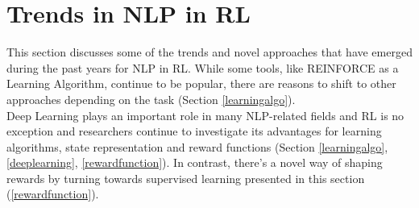 \documentclass[11pt]{article}
\begin{document}
\section{Trends in NLP in RL}\label{trends}
This section discusses some of the trends and novel approaches that have emerged during the past years for NLP in RL. While some tools, like REINFORCE as a Learning Algorithm, continue to be popular, there are reasons to shift to other approaches depending on the task (Section \ref{learningalgo}). \\ Deep Learning plays an important role in many NLP-related fields and RL is no exception and researchers continue to investigate its advantages for learning algorithms, state representation and reward functions (Section \ref{learningalgo}, \ref{deeplearning}, \ref{rewardfunction}). In contrast, there's a novel way of shaping rewards by turning towards supervised learning presented in this section (\ref{rewardfunction}).
\end{document}
